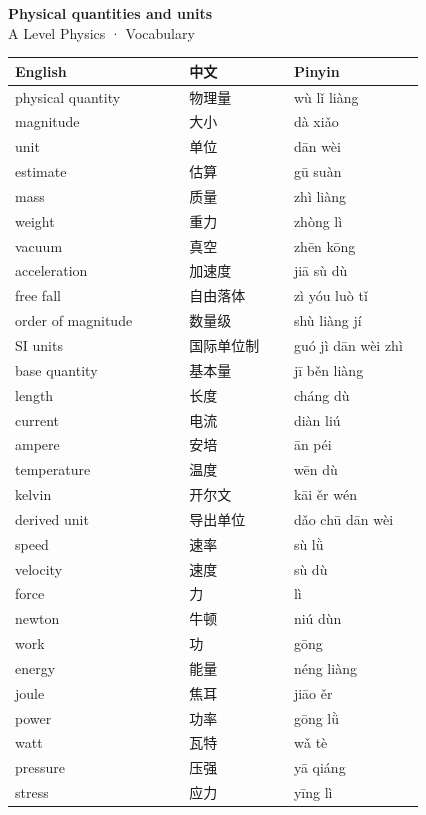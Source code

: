 \documentclass[11pt]{article}
\begin{document}
\begin{center}
  {\LARGE\bfseries Physical quantities and units}\\[0.35em]
  {\large A Level Physics · Vocabulary}
\end{center}
\vspace{0.6em}

\begin{longtable}{@{}p{0.40\linewidth}p{0.24\linewidth}p{0.30\linewidth}@{}}
\toprule
\textbf{English} & \textbf{中文} & \textbf{Pinyin} \\
\midrule
\endhead
\bottomrule
\endlastfoot
physical quantity & 物理量 & wù lǐ liàng \\
magnitude & 大小 & dà xiǎo \\
unit & 单位 & dān wèi \\
estimate & 估算 & gū suàn \\
mass & 质量 & zhì liàng \\
weight & 重力 & zhòng lì \\
vacuum & 真空 & zhēn kōng \\
acceleration & 加速度 & jiā sù dù \\
free fall & 自由落体 & zì yóu luò tǐ \\
order of magnitude & 数量级 & shù liàng jí \\
SI units & 国际单位制 & guó jì dān wèi zhì \\
base quantity & 基本量 & jī běn liàng \\
length & 长度 & cháng dù \\
current & 电流 & diàn liú \\
ampere & 安培 & ān péi \\
temperature & 温度 & wēn dù \\
kelvin & 开尔文 & kāi ěr wén \\
derived unit & 导出单位 & dǎo chū dān wèi \\
speed & 速率 & sù lǜ \\
velocity & 速度 & sù dù \\
force & 力 & lì \\
newton & 牛顿 & niú dùn \\
work & 功 & gōng \\
energy & 能量 & néng liàng \\
joule & 焦耳 & jiāo ěr \\
power & 功率 & gōng lǜ \\
watt & 瓦特 & wǎ tè \\
pressure & 压强 & yā qiáng \\
stress & 应力 & yīng lì \\

\end{longtable}
\end{document}
